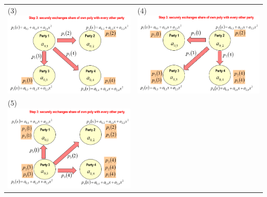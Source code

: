 \documentclass{book}
\begin{document}
\begin{tabularx}{0.99\textwidth}{X X}
    \\
    (3)\includegraphics[scale=0.4]{2022-01-02-15-59-59.png}%
     &
    (4)\includegraphics[scale=0.4]{2022-01-02-16-00-20.png}%
    \\
    (5)\includegraphics[scale=0.4]{2022-01-02-16-04-23.png}%

\end{tabularx}
\end{document}
